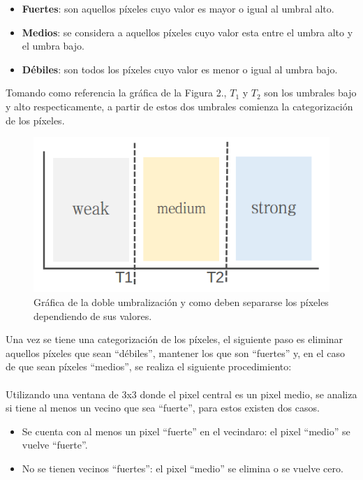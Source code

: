 \documentclass[conference]{IEEEtran}
\begin{document}
\begin{itemize}
	\item \textbf{Fuertes}: son aquellos p\'ixeles cuyo valor es mayor o igual al umbral alto.
	\item \textbf{Medios}: se considera a aquellos p\'ixeles cuyo valor esta entre el umbra alto y el umbra bajo.
	\item \textbf{D\'ebiles}: son todos los p\'ixeles cuyo valor es menor o igual al umbra bajo.\\
\end{itemize}

Tomando como referencia la gr\'afica de la Figura 2., $T_1$ y $T_2$ son los umbrales bajo y alto respecticamente, a partir de estos dos umbrales comienza la categorizaci\'on de los p\'ixeles.\\

\begin{figure}[h]
	\setlength{\unitlength}{0.0125in}
	\centering
	\includegraphics[scale=0.40]{./images/histeresis.png}
	\caption{Gr\'afica de la doble umbralizaci\'on y como deben separarse los p\'ixeles dependiendo de sus valores.}	
\end{figure}
\newpage
Una vez se tiene una categorizaci\'on de los p\'ixeles, el siguiente paso es eliminar aquellos p\'ixeles que sean ``d\'ebiles'', mantener los que son ``fuertes'' y, en el caso de que sean p\'ixeles ``medios'', se realiza el siguiente procedimiento:\\\\
Utilizando una ventana de 3x3 donde el pixel central es un pixel medio, se analiza si tiene al menos un vecino que sea ``fuerte'', para estos existen dos casos.\\
\begin{itemize}
	\item Se cuenta con al menos un pixel ``fuerte'' en el vecindaro: el pixel ``medio'' se vuelve ``fuerte''.
	\item No se tienen vecinos ``fuertes'': el pixel ``medio'' se elimina o se vuelve cero.\\
\end{itemize}
\end{document}
